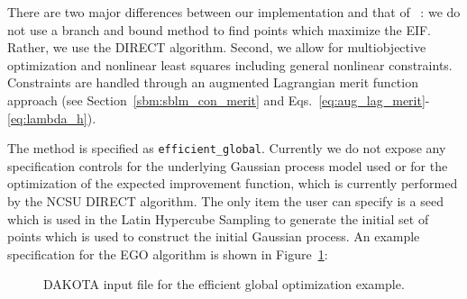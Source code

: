 There are two major differences between our implementation and that of
~\cite{Jon98}: we do not use a branch and bound method to find points
which maximize the EIF.  Rather, we use the DIRECT algorithm.  Second,
we allow for multiobjective optimization and nonlinear least squares
including general nonlinear constraints.  Constraints are handled
through an augmented Lagrangian merit function approach (see
Section~\ref{sbm:sblm_con_merit} and
Eqs.~\ref{eq:aug_lag_merit}-\ref{eq:lambda_h}).

The method is specified as \texttt{efficient\_global}.  Currently we
do not expose any specification controls for the underlying Gaussian
process model used or for the optimization of the expected improvement
function, which is currently performed by the NCSU DIRECT
algorithm. The only item the user can specify is a seed which is 
used in the Latin Hypercube Sampling to generate the initial 
set of points which is used to construct the initial Gaussian process. 
An example specification for the EGO algorithm is shown in
Figure~\ref{sbm:egm_rosen}:
\begin{figure}
  \begin{bigbox}
    \begin{small}
    \end{small}
  \end{bigbox}
  \caption{DAKOTA input file for the efficient global optimization example.}
  \label{sbm:egm_rosen}
\end{figure}

